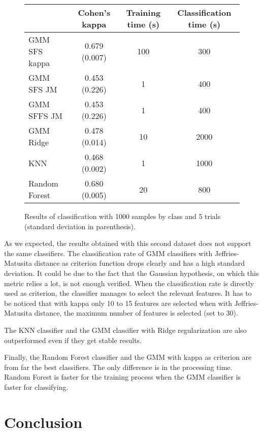 \documentclass[a4paper,11pt,DIV=16,abstracton]{scrartcl}
\begin{document}
    \begin{figure}[!ht]
        \centering
        \begin{tabular}{|l|c|c|c|}\hline
             & {\bfseries Cohen's kappa} & {\bfseries Training time (s)} & {\bfseries Classification time (s)}\\ \hline

            GMM SFS kappa & 0.679 (0.007) & 100 & 300 \\
            GMM SFS JM &    0.453 (0.226) & 1 & 400 \\
            GMM SFFS JM &   0.453 (0.226) & 1 & 400 \\
            GMM Ridge &     0.478 (0.014) & 10 & 2000 \\
            KNN &           0.468 (0.002) & 1 & 1000 \\
            Random Forest & 0.680 (0.005) & 20 & 800 \\

            \hline
        \end{tabular}
        \caption{Results of classification with 1000 samples by class and 5 trials (standard deviation in parenthesis).\label{tab:potsdam-otbsimu}}
    \end{figure}

    As we expected, the results obtained with this second dataset does not support the same classifiers. The classification rate of GMM classifiers with Jeffries-Matusita distance as criterion function drops clearly and has a high standard deviation. It could be due to the fact that the Gaussian hypothesis, on which this metric relies a lot, is not enough verified. When the classification rate is directly used as criterion, the classifier manages to select the relevant features. It has to be noticed that with kappa only 10 to 15 features are selected when with Jeffries-Matusita distance, the maximum number of features is selected (set to 30).

    The KNN classifier and the GMM classifier with Ridge regularization are also outperformed even if they get stable results.

    Finally, the Random Forest classifier and the GMM with kappa as criterion are from far the best classifiers. The only difference is in the processing time. Random Forest is faster for the training process when the GMM classifier is faster for classifying.

\section{Conclusion}
\end{document}
